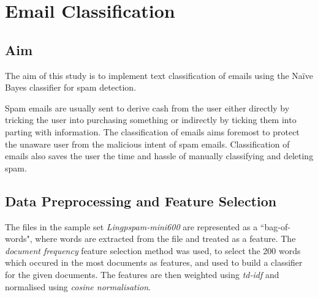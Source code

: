 \documentclass[10pt, a4paper]{article}
\begin{document}
\section{Email Classification}

\subsection*{Aim}

The aim of this study is to implement text classification of emails using the Na\"{i}ve Bayes classifier for spam detection.

Spam emails are usually sent to derive cash from the user either directly by tricking the user into purchasing something or indirectly by ticking them into parting with information. The classification of emails aims foremost to protect the unaware user from the malicious intent of spam emails. Classification of emails also saves the user the time and hassle of manually classifying and deleting spam.

\subsection*{Data Preprocessing and Feature Selection}
The files in the sample set \emph{Lingpspam-mini600} are represented as a ``bag-of-words", where words are extracted from the file and treated as a feature. The \emph{document frequency} feature selection method was used, to select the 200 words which occured in the most documents as features, and used to build a classifier for the given documents. The features are then weighted using \emph{td-idf} and normalised using \emph{cosine normalisation}.
\end{document}
